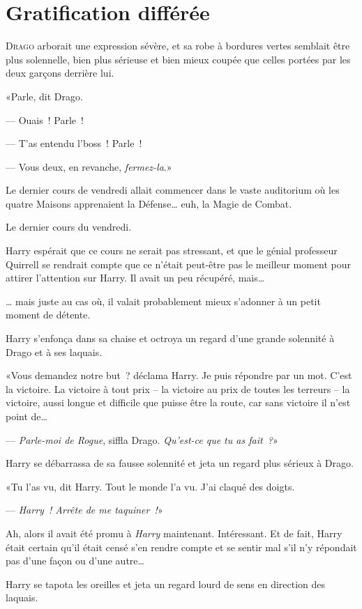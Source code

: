 \chapter{Gratification différée}

\lettrine{D}{rago} arborait une expression sévère, et sa robe à bordures vertes semblait être plus solennelle, bien plus sérieuse et bien mieux coupée que celles portées par les deux garçons derrière lui.

«Parle, dit Drago.

--- Ouais~! Parle~!

--- T'as entendu l'boss~! Parle~!

--- Vous deux, en revanche, \emph{fermez-la}.»

Le dernier cours de vendredi allait commencer dans le vaste auditorium où les quatre Maisons apprenaient la Défense… euh, la Magie de Combat.

Le dernier cours du vendredi.

Harry espérait que ce cours ne serait pas stressant, et que le génial professeur Quirrell se rendrait compte que ce n'était peut-être pas le meilleur moment pour attirer l'attention sur Harry. Il avait un peu récupéré, mais…

… mais juste au cas où, il valait probablement mieux s'adonner à un petit moment de détente.

Harry s'enfonça dans sa chaise et octroya un regard d'une grande solennité à Drago et à ses laquais.

«Vous demandez notre but~? déclama Harry. Je puis répondre par un mot. C'est la victoire. La victoire à tout prix -- la victoire au prix de toutes les terreurs -- la victoire, aussi longue et difficile que puisse être la route, car sans victoire il n'est point de…

--- \emph{Parle-moi de Rogue}, siffla Drago. \emph{Qu'est-ce que tu as fait~?}»

Harry se débarrassa de sa fausse solennité et jeta un regard plus sérieux à Drago.

«Tu l'as vu, dit Harry. Tout le monde l'a vu. J'ai claqué des doigts.

--- \emph{Harry~! Arrête de me taquiner~!}»

Ah, alors il avait été promu à \emph{Harry} maintenant. Intéressant. Et de fait, Harry était certain qu'il était censé s'en rendre compte et se sentir mal s'il n'y répondait pas d'une façon ou d'une autre…

Harry se tapota les oreilles et jeta un regard lourd de sens en direction des laquais.

